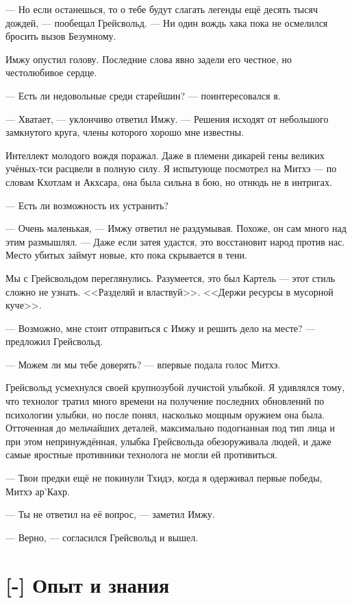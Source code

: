 --- Но если останешься, то о тебе будут слагать легенды ещё десять тысяч дождей, --- пообещал Грейсвольд.
--- Ни один вождь хака пока не осмелился бросить вызов Безумному.

Имжу опустил голову.
Последние слова явно задели его честное, но честолюбивое сердце.

--- Есть ли недовольные среди старейшин? --- поинтересовался я.

--- Хватает, --- уклончиво ответил Имжу.
--- Решения исходят от небольшого замкнутого круга, члены которого хорошо мне известны.

Интеллект молодого вождя поражал.
Даже в племени дикарей гены великих учёных-тси расцвели в полную силу.
Я испытующе посмотрел на Митхэ --- по словам Кхотлам и Акхсара, она была сильна в бою, но отнюдь не в интригах.

--- Есть ли возможность их устранить?

--- Очень маленькая, --- Имжу ответил не раздумывая.
Похоже, он сам много над этим размышлял.
--- Даже если затея удастся, это восстановит народ против нас.
Место убитых займут новые, кто пока скрывается в тени.

Мы с Грейсвольдом переглянулись.
Разумеется, это был Картель --- этот стиль сложно не узнать.
<<Разделяй и властвуй>>.
<<Держи ресурсы в мусорной куче>>.

--- Возможно, мне стоит отправиться с Имжу и решить дело на месте? --- предложил Грейсвольд.

--- Можем ли мы тебе доверять? --- впервые подала голос Митхэ.

Грейсвольд усмехнулся своей крупнозубой лучистой улыбкой.
Я удивлялся тому, что технолог тратил много времени на получение последних обновлений по психологии улыбки, но после понял, насколько мощным оружием она была.
Отточенная до мельчайших деталей, максимально подогнанная под тип лица и при этом непринуждённая, улыбка Грейсвольда обезоруживала людей, и даже самые яростные противники технолога не могли ей противиться.

--- Твои предки ещё не покинули Тхидэ, когда я одерживал первые победы, Митхэ ар’Кахр.

--- Ты не ответил на её вопрос, --- заметил Имжу.

--- Верно, --- согласился Грейсвольд и вышел.

\section{[-] Опыт и знания}

